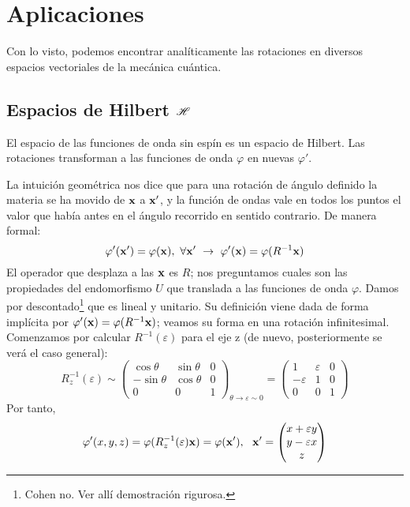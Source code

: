 \section{Aplicaciones}
Con lo visto, podemos encontrar analíticamente las rotaciones en
diversos espacios vectoriales de la mecánica cuántica.
\subsection{Espacios de Hilbert $ \mathscr{H} $}
El espacio de las funciones de onda sin espín es un espacio de
Hilbert. Las rotaciones transforman a las funciones de onda $\varphi$ en
nuevas $\varphi'$. 

La intuición geométrica nos dice que para una rotación de ángulo
definido la materia se ha movido de $\bm{\mathrm{x}}$ a $\bm{\mathrm{x}}'$, y la
función de ondas vale en todos los puntos el valor que había antes en
el ángulo recorrido en sentido contrario. De manera formal:
\begin{equation}
  \varphi'(\boldrm{x}') = \varphi(\boldrm{x}), \ \forall \boldrm{x}' \
  \rightarrow \ \varphi'(\boldrm{x}) = \varphi(R^{-1}\boldrm{x})
\end{equation}
El operador que desplaza a las $\bm{\mathrm{x}}$ es $R$; nos preguntamos
cuales son las propiedades del endomorfismo $U$ que translada a las
funciones de onda $\varphi$. Damos por descontado\footnote{Cohen no. Ver
allí demostración rigurosa.} que es lineal y unitario. 
Su definición
viene dada de forma implícita por $\varphi'(\bm{\mathrm{x}}) =
\varphi(R^{-1}\bm{\mathrm{x}})$; veamos su forma en una rotación
infinitesimal. Comenzamos por calcular $R^{-1}(\varepsilon)$ para el eje
z (de nuevo, posteriormente se verá el caso general):
\begin{equation}
  R^{-1}_z(\varepsilon) \sim
  \begin{pmatrix}
    \cos \theta & \sin \theta & 0 \\
    -\sin \theta & \cos \theta & 0 \\
    0 & 0 & 1 
  \end{pmatrix}_{\theta \to \varepsilon \sim 0} =
  \begin{pmatrix}
    1 & \varepsilon & 0 \\
    -\varepsilon&1 & 0 \\
    0 & 0 & 1
  \end{pmatrix}
\end{equation}
Por tanto,
\begin{equation}
  \varphi'(x,y,z) = \varphi(R^{-1}_z(\varepsilon) \bm{\mathrm{x}}) =
  \varphi(\bm{\mathrm{x}}'), \ \ \bm{\mathrm{x}}' =
  \begin{pmatrix}
    x+\varepsilon y \\
    y-\varepsilon x \\
    z
  \end{pmatrix}
\end{equation}
